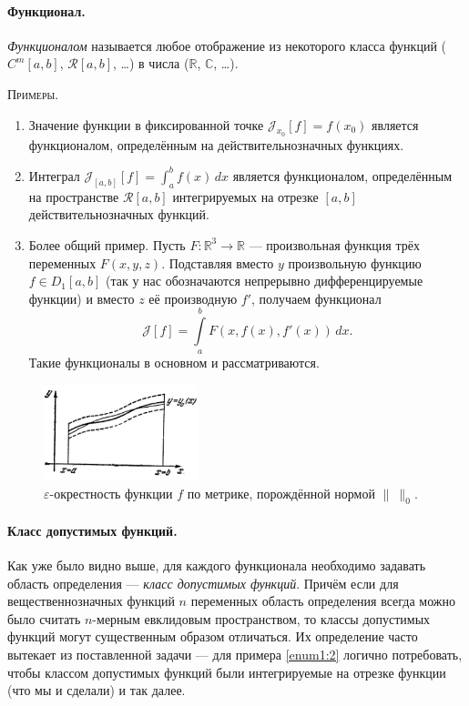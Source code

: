 \paragraph{Функционал.}
\begin{definition}
\emph{Функционалом}
называется любое отображение из некоторого класса функций ($ C^m[a, b] $, $
\mathscr R[a,b] $, \ldots) в числа
($ \mathbb R $, $ \mathbb C $, \ldots). 
\end{definition}

\textsc{Примеры.}
\begin{enumerate}
  \item Значение функции в фиксированной точке $ \mathscr{J}_{x_0}[f] = f(x_0) $
    является функционалом, определённым на действительнозначных функциях.
  \item\label{enum1:2} Интеграл $ \mathscr{J}_{[a,b]}[f] = \int_{a}^{b} f(x)\,dx $ является
    функционалом, определённым на пространстве $ \mathscr{R}[a,b] $
    интегрируемых на отрезке $ [a,b] $ действительнозначных функций.
  \item Более общий пример. Пусть $ F\colon \mathbb R^3 \to \mathbb R $ ---
    произвольная функция трёх переменных $ F(x, y, z) $. Подставляя вместо $ y $
    произвольную функцию $ f \in D_1[a, b] $ (так у нас обозначаются непрерывно
    дифференцируемые функции) и вместо $ z $ её производную $ f'
    $, получаем функционал  
    \[
      \mathscr{J}[f] = \int\limits_{a}^{b}F(x, f(x), f'(x))\,dx.
    \]
   Такие функционалы в основном и рассматриваются. 
\end{enumerate}

\begin{figure}
  \centering
  \includegraphics[width=0.4\textwidth]{Figures/norm_0.png}
  \caption{$ \varepsilon $-окрестность функции $ f $ по метрике, порождённой
  нормой $ \|\ \|_0 $.}
  \label{fig:norm_0}
\end{figure}
\paragraph{Класс допустимых функций.} Как уже было видно выше, для каждого
функционала необходимо задавать область определения --- \emph{класс допустимых
функций}. Причём если для вещественнозначных функций $ n $ переменных область
определения всегда можно было считать $ n $-мерным евклидовым пространством, то
классы допустимых функций могут существенным образом отличаться. Их определение
часто вытекает из поставленной задачи --- для примера \ref{enum1:2} логично
потребовать, чтобы классом допустимых функций были интегрируемые на отрезке
функции (что мы и сделали) и так далее.

